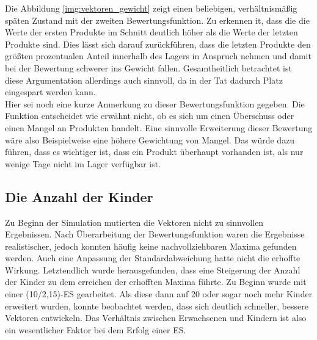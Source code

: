 \documentclass[]{scrartcl}
\begin{document}
Die Abbildung \ref{img:vektoren_gewicht} zeigt einen beliebigen, verhältnismäßig späten Zustand mit der zweiten Bewertungsfunktion. Zu erkennen it, dass die die Werte der ersten Produkte im Schnitt deutlich höher als die Werte der letzten Produkte sind. Dies lässt sich darauf zurückführen, dass die letzten Produkte den größten prozentualen Anteil innerhalb des Lagers in Anspruch nehmen und damit bei der Bewertung schwerer ins Gewicht fallen. Gesamtheitlich betrachtet ist diese Argumentation allerdings auch sinnvoll, da in der Tat dadurch Platz eingespart werden kann.\\

Hier sei noch eine kurze Anmerkung zu dieser Bewertungsfunktion gegeben. Die Funktion entscheidet wie erwähnt nicht, ob es sich um einen Überschuss oder einen Mangel an Produkten handelt. Eine sinnvolle Erweiterung dieser Bewertung wäre also Beispielweise eine höhere Gewichtung von Mangel. Das würde dazu führen, dass es wichtiger ist, dass ein Produkt überhaupt vorhanden ist, als nur wenige Tage nicht im Lager verfügbar ist.

\subsection{Die Anzahl der Kinder}
Zu Beginn der Simulation mutierten die Vektoren nicht zu sinnvollen Ergebnissen. Nach Überarbeitung der Bewertungsfunktion waren die Ergebnisse realistischer, jedoch konnten häufig keine nachvollziehbaren Maxima gefunden werden. Auch eine Anpassung der Standardabweichung hatte nicht die erhoffte Wirkung. Letztendlich wurde herausgefunden, dass eine Steigerung der Anzahl der Kinder zu dem erreichen der erhofften Maxima führte. Zu Beginn wurde mit einer (10/2,15)-ES gearbeitet. Als diese dann auf 20 oder sogar noch mehr Kinder erweitert wurden, konnte beobachtet werden, dass sich deutlich schneller, bessere Vektoren entwickeln. Das Verhältnis zwischen Erwachsenen und Kindern ist also ein wesentlicher Faktor bei dem Erfolg einer ES. 
\end{document}
